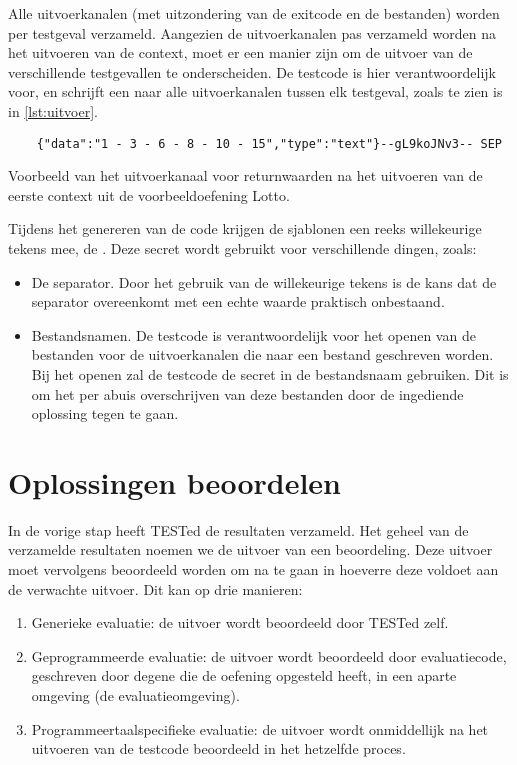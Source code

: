 Alle uitvoerkanalen (met uitzondering van de exitcode en de bestanden) worden per testgeval verzameld.
Aangezien de uitvoerkanalen pas verzameld worden na het uitvoeren van de context, moet er een manier zijn om de uitvoer van de verschillende testgevallen te onderscheiden.
De testcode is hier verantwoordelijk voor, en schrijft een  naar alle uitvoerkanalen tussen elk testgeval, zoals te zien is in \cref{lst:uitvoer}.

\begin{listing}
    \begin{verbatim}
    {"data":"1 - 3 - 6 - 8 - 10 - 15","type":"text"}--gL9koJNv3-- SEP
    \end{verbatim}
    \caption{Voorbeeld van het uitvoerkanaal voor returnwaarden na het uitvoeren van de eerste context uit de voorbeeldoefening Lotto.}
    \label{lst:uitvoer}
\end{listing}

Tijdens het genereren van de code krijgen de sjablonen een reeks willekeurige tekens mee, de .
Deze secret wordt gebruikt voor verschillende dingen, zoals:
\begin{itemize}
    \item De separator.
    Door het gebruik van de willekeurige tekens is de kans dat de separator overeenkomt met een echte waarde praktisch onbestaand.
    \item Bestandsnamen.
    De testcode is verantwoordelijk voor het openen van de bestanden voor de uitvoerkanalen die naar een bestand geschreven worden.
    Bij het openen zal de testcode de secret in de bestandsnaam gebruiken.
    Dit is om het per abuis overschrijven van deze bestanden door de ingediende oplossing tegen te gaan.
\end{itemize}

\section{Oplossingen beoordelen}\label{sec:oplossingen-beoordelen}

In de vorige stap heeft TESTed de resultaten verzameld.
Het geheel van de verzamelde resultaten noemen we de uitvoer van een beoordeling.
Deze uitvoer moet vervolgens beoordeeld worden om na te gaan in hoeverre deze voldoet aan de verwachte uitvoer.
Dit kan op drie manieren:
\begin{enumerate}
    \item Generieke evaluatie: de uitvoer wordt beoordeeld door TESTed zelf.
    \item Geprogrammeerde evaluatie: de uitvoer wordt beoordeeld door evaluatiecode, geschreven door degene die de oefening opgesteld heeft, in een aparte omgeving (de evaluatieomgeving).
    \item Programmeertaalspecifieke evaluatie: de uitvoer wordt onmiddellijk na het uitvoeren van de testcode beoordeeld in het hetzelfde proces.
\end{enumerate}

